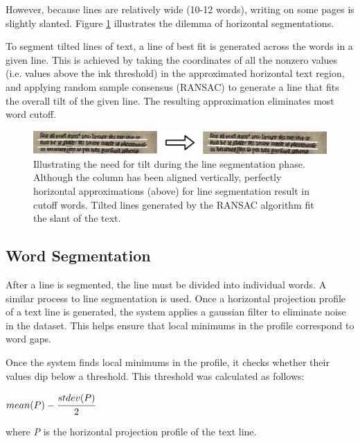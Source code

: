 \documentclass[final]{ukthesis}
\begin{document}
However, because lines are relatively wide (10-12 words), writing on some pages is slightly slanted. Figure \ref{fig:flat-vs-tilted} illustrates the dilemma of horizontal segmentations.

To segment tilted lines of text, a line of best fit is generated across the words in a given line. This is achieved by taking the coordinates of all the nonzero values (i.e. values above the ink threshold) in the approximated horizontal text region, and applying random sample consensus (RANSAC) \cite{fischler1987random} to generate a line that fits the overall tilt of the given line. The resulting approximation eliminates most word cutoff.

\begin{figure}[t]
\begin{center}
\includegraphics[width=14cm]{flat-vs-tilted}
\end{center}
\caption{Illustrating the need for tilt during the line segmentation phase. Although the column has been aligned vertically, perfectly horizontal approximations (above) for line segmentation result in cutoff words. Tilted lines generated by the RANSAC algorithm fit the slant of the text.}
\label{fig:flat-vs-tilted}
\end{figure}


\subsection{Word Segmentation}
After a line is segmented, the line must be divided into individual words. A similar process to line segmentation is used. Once a horizontal projection profile of a text line is generated, the system applies a gaussian filter to eliminate noise in the dataset. This helps ensure that local minimums in the profile correspond to word gaps.

Once the system finds local minimums in the profile, it checks whether their values dip below a threshold. This threshold was calculated as follows:

\begin{center}
\begin{math}
mean(P) - \cfrac{stdev(P)}{2}
\end{math}
\end{center}

where {\em P} is the horizontal projection profile of the text line.
\end{document}
